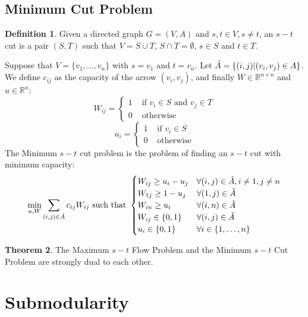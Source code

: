 \documentclass[11pt, openany]{report}
\newcommand{\R}{\mathbb{R}}
\theoremstyle{definition}
\newtheorem{thm}{Theorem}[chapter]
\newtheorem{definition}[thm]{Definition}
\begin{document}
\section{Minimum Cut Problem}
\begin{definition}
    Given a directed graph $G=(V,A)$ and $s,t\in V,s\neq t$, an $s-t$ cut is a pair $(S,T)$ such that $V=S\cup T$, $S\cap T=\emptyset$, $s\in S$ and $t\in T$.
\end{definition}
Suppose that $V=\{v_1,\dots,v_n\}$ with $s=v_1$ and $t=v_n$. Let $\Tilde A=\{(i,j)|(v_i,v_j)\in A\}$. We define $c_{ij}$ as the capacity of the arrow $(v_i,v_j)$, and finally $W\in \R^{n\times n}$ and $u\in \R^n$:
\begin{equation}
    W_{ij} = \begin{cases}
        1& \text{ if } v_i \in S\text{ and } v_j\in T\\
        0& \text{ otherwise}    
    \end{cases}
\end{equation}
\begin{equation}
    u_i = \begin{cases}
        1& \text{ if } v_i \in S\\
        0& \text{ otherwise}    
    \end{cases}
\end{equation}
The Minimum $s-t$ cut problem is the problem of finding an $s-t$ cut with minimum capacity:
\begin{equation}
    \min_{u,W} \sum_{(i,j)\in \Tilde A}c_{ij}W_{ij}\text{ such that } \begin{cases}
        W_{ij}\ge u_i-u_j & \forall (i,j)\in \Tilde A, i\neq 1, j \neq n\\
        W_{1j}\ge 1-u_j & \forall (1,j)\in \Tilde A\\
        W_{in}\ge u_i & \forall (i,n)\in \Tilde A\\
        W_{ij}\in \{0,1\}& \forall (i,j)\in \Tilde A\\
        u_i \in \{0,1\} & \forall i\in \{1,\dots,n\}\\
    \end{cases}
\end{equation}
\begin{thm}
    The Maximum $s-t$ Flow Problem and the Minimum $s-t$ Cut Problem are strongly dual to each other.
\end{thm}
\chapter{Submodularity}
\end{document}
